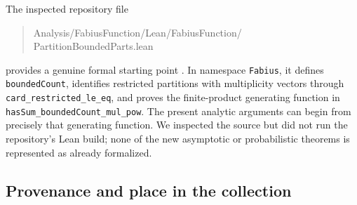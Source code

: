 \documentclass[11pt]{article}
\theoremstyle{definition}
\theoremstyle{remark}
\numberwithin{equation}{section}
\begin{document}
The inspected repository file
\begin{quote}\small\ttfamily
Analysis/FabiusFunction/Lean/FabiusFunction/\\
PartitionBoundedParts.lean
\end{quote}
provides a genuine formal starting point \cite{proveit}. In namespace
\texttt{Fabius}, it defines \texttt{boundedCount}, identifies restricted
partitions with multiplicity vectors through
\texttt{card\_restricted\_le\_eq}, and proves the finite-product generating
function in \texttt{hasSum\_boundedCount\_mul\_pow}. The present analytic
arguments can begin from precisely that generating function. We inspected
the source but did not run the repository's Lean build; none of the new
asymptotic or probabilistic theorems is represented as already formalized.

\subsection{Provenance and place in the collection}\label{rpc:sec:provenance}
\end{document}
